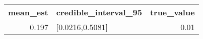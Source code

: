 \begin{longtable}{rlr}
\toprule
mean\_est & credible\_interval\_95 & true\_value \\ 
\midrule
0.197 & [0.0216,0.5081] & 0.01 \\ 
\bottomrule
\end{longtable}

